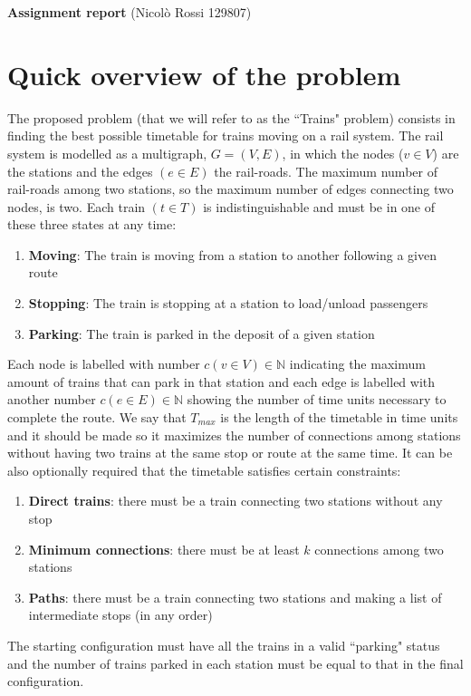 \documentclass[11pt]{article}
\begin{document}
\newtheorem{Definizione}{Definizione}
\newtheorem{Lemma}{Lemma}
\newtheorem{Teorema}{Teorema}
\textbf{Assignment report} (Nicolò Rossi 129807)
\tableofcontents
\newpage
\section{Quick overview of the problem}
The proposed problem (that we will refer to as the ``Trains" problem) consists in finding the best possible timetable for trains moving on a rail system. 
The rail system is modelled as a multigraph, $G=(V,E)$, in which the nodes ($v\in V$) are the stations and the edges $(e\in E)$ the rail-roads. The maximum number of rail-roads among two stations, so the maximum number of edges connecting two nodes, is two.
Each train $(t \in T)$ is indistinguishable and must be in one of these three states at any time:
\begin{enumerate}
\item \textbf{Moving}: The train is moving from a station to another following a given route
\item \textbf{Stopping}: The train is stopping at a station to load/unload passengers
\item \textbf{Parking}: The train is parked in the deposit of a given station
\end{enumerate} 
Each node is labelled with number $c(v \in V) \in \mathbb{N}$ indicating the maximum amount of trains that can park in that station and each edge is labelled with another number $c(e \in E) \in \mathbb{N}$ showing the number of time units necessary to complete the route.
We say that $T_{max}$ is the length of the timetable in time units and it should be 
made so it maximizes the number of connections among stations without having two 
trains at the same stop or route at the same time. 
It can be also optionally required that the timetable satisfies certain constraints:
\begin{enumerate}
\item \textbf{Direct trains}: there must be a train connecting two stations without any stop
\item \textbf{Minimum connections}: there must be at least $k$ connections among two stations
\item \textbf{Paths}: there must be a train connecting two stations and making a list of intermediate stops (in any order)
\end{enumerate} 
The starting configuration must have all the trains in a valid ``parking" status and 
the number of trains parked in each station must be equal to that in 
the final configuration. 
\end{document}
